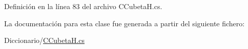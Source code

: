 Definición en la línea 83 del archivo C\-Cubeta\-H.\-cs.



La documentación para esta clase fue generada a partir del siguiente fichero\-:\begin{DoxyCompactItemize}
\item 
Diccionario/\hyperlink{_c_cubeta_h_8cs}{C\-Cubeta\-H.\-cs}\end{DoxyCompactItemize}

